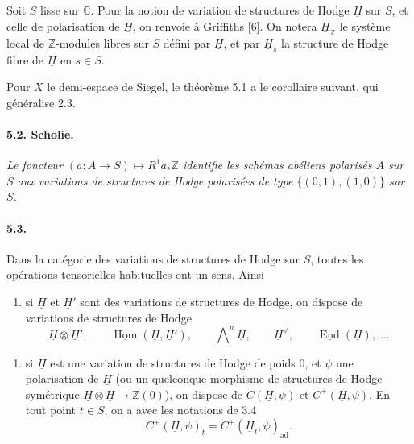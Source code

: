 \documentclass[10pt,leqno]{article}
\newcommand{\C}{\mathbb{C}}
\newcommand{\Z}{\mathbb{Z}}
\newcommand{\End}{\operatorname{End}}
\newcommand{\Hom}{\operatorname{Hom}}
\newcommand{\ad}{\operatorname{ad}}
\begin{document}
Soit $S$ lisse sur $\C$. Pour la notion de variation de structures de Hodge $\underline H$ sur $S$, et celle de polarisation de $\underline H$, on renvoie à Griffiths [6]. On notera $\underline H_\Z$ le système local de $\Z$-modules libres sur $S$ défini par $\underline H$, et par $\underline H_s$ la structure de Hodge fibre de $\underline H$ en $s\in S$.

Pour $X$ le demi-espace de Siegel, le théorème 5.1 a le corollaire suivant, qui généralise 2.3.

\paragraph{5.2. Scholie.} \emph{Le foncteur $(a:A\to S)\mapsto R^1a_*\Z$ identifie les schémas abéliens polarisés $A$ sur $S$ aux variations de structures de Hodge polarisées de type $\{(0,1),(1,0)\}$ sur $S$.}

\paragraph{5.3.} Dans la catégorie des variations de structures de Hodge sur $S$, toutes les opérations tensorielles habituelles ont un sens. Ainsi
\begin{enumerate}[label=\alph*)]
\item si $\underline H$ et $\underline H'$ sont des variations de structures de Hodge, on dispose de variations de structures de Hodge
\[
\underline H\otimes\underline H',\qquad
\underline{\Hom}(\underline H,\underline H'),\qquad
\bigwedge\nolimits^n\underline H,\qquad
\underline H^\vee,\qquad
\underline{\End}(\underline H),\ldots.
\]
\end{enumerate}

\clearpage

\begin{enumerate}[label=\alph*),start=2]
\item si $\underline H$ est une variation de structures de Hodge de poids $0$, et $\psi$ une polarisation de $\underline H$ (ou un quelconque morphisme de structures de Hodge symétrique $\underline H\otimes\underline H\to\Z(0)$), on dispose de $C(\underline H,\psi)$ et $C^+(\underline H,\psi)$. En tout point $t\in S$, on a avec les notations de 3.4
\[
C^+(\underline H,\psi)_t=C^+(\underline H_t,\psi)_{\ad}.
\]
\end{enumerate}
\end{document}
